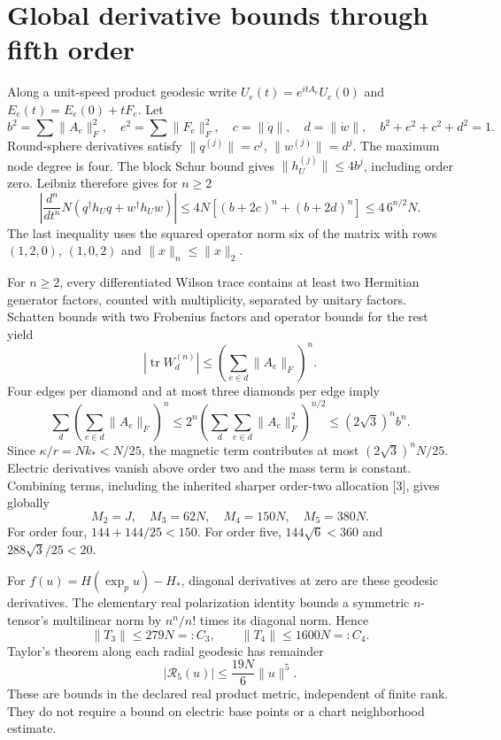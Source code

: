 \documentclass[11pt,a4paper]{article}
\newcommand{\tr}{\operatorname{tr}}\newcommand{\diag}{\operatorname{diag}}\newcommand{\Rea}{\operatorname{Re}}
\begin{document}
\section{Global derivative bounds through fifth order}
Along a unit-speed product geodesic write $U_e(t)=e^{itA_e}U_e(0)$ and $E_e(t)=E_e(0)+tF_e$. Let
\[
b^2=\sum\|A_e\|_F^2,\quad e^2=\sum\|F_e\|_F^2,
\quad c=\|\dot q\|,\quad d=\|\dot w\|,
\quad b^2+e^2+c^2+d^2=1.
\]
Round-sphere derivatives satisfy $\|q^{(j)}\|=c^j$, $\|w^{(j)}\|=d^j$. The maximum node degree is four. The block Schur bound gives $\|h_U^{(j)}\|\le4b^j$, including order zero. Leibniz therefore gives for $n\ge2$
\[
\left|\frac{d^n}{dt^n}N(q^\dagger h_Uq+w^\dagger h_Uw)\right|
\le4N[(b+2c)^n+(b+2d)^n]\le4\,6^{n/2}N.
\]
The last inequality uses the squared operator norm six of the matrix with rows $(1,2,0)$, $(1,0,2)$ and $\|x\|_n\le\|x\|_2$.

For $n\ge2$, every differentiated Wilson trace contains at least two Hermitian generator factors, counted with multiplicity, separated by unitary factors. Schatten bounds with two Frobenius factors and operator bounds for the rest yield
\[
|\tr W_d^{(n)}|\le\left(\sum_{e\in d}\|A_e\|_F\right)^n.
\]
Four edges per diamond and at most three diamonds per edge imply
\[
\sum_d\left(\sum_{e\in d}\|A_e\|_F\right)^n
\le2^n\left(\sum_d\sum_{e\in d}\|A_e\|_F^2\right)^{n/2}
\le(2\sqrt3)^n b^n.
\]
Since $\kappa/r=Nk_*<N/25$, the magnetic term contributes at most $(2\sqrt3)^nN/25$. Electric derivatives vanish above order two and the mass term is constant. Combining terms, including the inherited sharper order-two allocation [3], gives globally
\[
\boxed{M_2=J,\quad M_3=62N,\quad M_4=150N,\quad M_5=380N.}
\]
For order four, $144+144/25<150$. For order five, $144\sqrt6<360$ and $288\sqrt3/25<20$.

For $f(u)=H(\exp_pu)-H_*$, diagonal derivatives at zero are these geodesic derivatives. The elementary real polarization identity bounds a symmetric $n$-tensor's multilinear norm by $n^n/n!$ times its diagonal norm. Hence
\begin{equation}\label{eq:tensors}
\|T_3\|\le279N=:C_3,\qquad
\|T_4\|\le1600N=:C_4.
\end{equation}
Taylor's theorem along each radial geodesic has remainder
\begin{equation}\label{eq:remainder}
|\mathcal R_5(u)|\le\frac{19N}{6}\|u\|^5.
\end{equation}
These are bounds in the declared real product metric, independent of finite rank. They do not require a bound on electric base points or a chart neighborhood estimate.
\newpage
\end{document}
